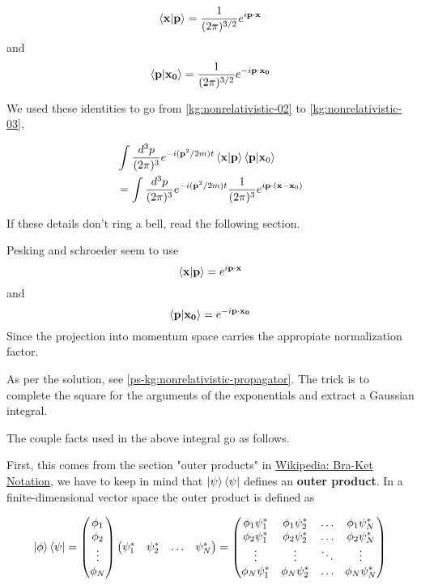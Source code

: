 $$
\braket{\boldsymbol{\mathbf{x}} | \boldsymbol{\mathbf{p}}} = \frac{1}{(2\pi)^{3/2}} e^{i\boldsymbol{\mathbf{p}}\cdot\boldsymbol{\mathbf{x}}}
$$
and 
$$
\braket{\boldsymbol{\mathbf{p}} | \boldsymbol{\mathbf{x_0}}} = \frac{1}{(2\pi)^{3/2}} e^{-i\boldsymbol{\mathbf{p}}\cdot\boldsymbol{\mathbf{x_0}}}
$$

We used these identities to go from \ref{kg:nonrelativistic-02} to \ref{kg:nonrelativistic-03},

\begin{align*}
& \int \frac{d^3p}{(2\pi)^3} e^{-i(\boldsymbol{\mathbf{p}}^2/2m)t} \braket{\boldsymbol{\mathbf{x}} | \boldsymbol{\mathbf{p}}} \braket{\boldsymbol{\mathbf{p}} | \boldsymbol{\mathbf{x}}_0} \\
&= \int \frac{d^3p}{(2\pi)^3} e^{-i(\boldsymbol{\mathbf{p}}^2/2m)t} \frac{1}{(2\pi)^3} e^{i\boldsymbol{\mathbf{p}}\cdot(\boldsymbol{\mathbf{x}}-\boldsymbol{\mathbf{x}}_0)} 
\end{align*}

If these details don't ring a bell, read the following section.

Pesking and schroeder seem to use
$$
\braket{\boldsymbol{\mathbf{x}} | \boldsymbol{\mathbf{p}}} = e^{i\boldsymbol{\mathbf{p}}\cdot\boldsymbol{\mathbf{x}}}
$$
and 
$$
\braket{\boldsymbol{\mathbf{p}} | \boldsymbol{\mathbf{x_0}}} = e^{-i\boldsymbol{\mathbf{p}}\cdot\boldsymbol{\mathbf{x_0}}}
$$
Since the projection into momentum space carries the appropiate normalization factor.


As per the solution, see \ref{ps-kg:nonrelativistic-propagator}.
The trick is to complete the square for the arguments of the exponentials and extract a Gaussian integral.




The couple facts used in the above integral go as follows.

First, this comes from the section "outer products" in
\href{https://en.wikipedia.org/wiki/Bra%E2%80%93ket_notation}{Wikipedia: Bra-Ket Notation},
we have to keep in mind that $\ket{\psi}\bra{\psi}$ defines an \textbf{outer product}.
In a finite-dimensional vector space the outer product is defined as

$$
\ket{\phi}\bra{\psi}
=
\begin{pmatrix}
    \phi_1 \\
    \phi_2 \\
    \vdots \\
    \phi_N 
\end{pmatrix}
\begin{pmatrix}
    \psi_{1}^{*} & \psi_{2}^{*} & \ldots & \psi_{N}^{*}
\end{pmatrix}
=
\begin{pmatrix} 
    \phi_1 \psi_{1}^{*} & \phi_1 \psi_{2}^{*} & \dots  & \phi_1 \psi_{N}^{*} \\
    \phi_2 \psi_{1}^{*} & \phi_2 \psi_{2}^{*} & \dots  & \phi_2 \psi_{N}^{*} \\
    \vdots              & \vdots              & \ddots & \vdots              \\
    \phi_N \psi_{1}^{*} & \phi_N \psi_{2}^{*} & \dots  & \phi_N \psi_{N}^{*} \\
\end{pmatrix}
$$

